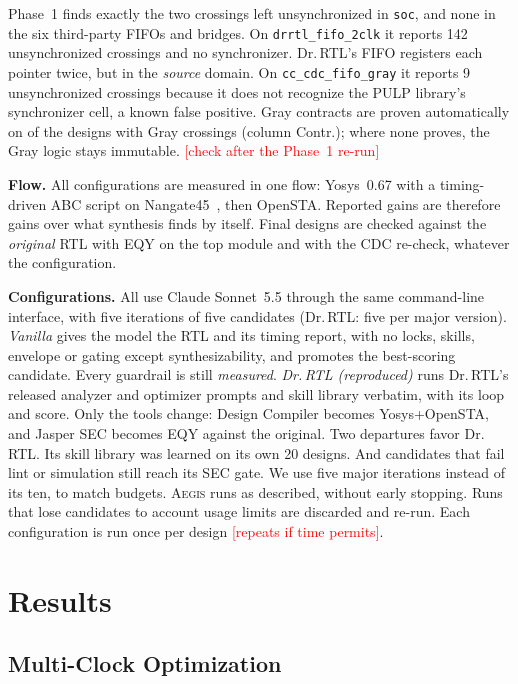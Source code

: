 \documentclass[conference,10pt]{IEEEtran}
\newcommand{\aegis}{\textsc{Aegis}}
\newcommand{\pend}[1]{\textcolor{red}{[#1]}}
\begin{document}
Phase~1 finds exactly the two crossings left unsynchronized in \texttt{soc}, and none in the six third-party
FIFOs and bridges. On \texttt{drrtl\_fifo\_2clk} it reports 142 unsynchronized crossings and
no synchronizer. Dr.\,RTL's FIFO registers each pointer twice, but in the \emph{source} domain. On
\texttt{cc\_cdc\_fifo\_gray} it reports 9 unsynchronized crossings because it does not recognize the PULP
library's synchronizer cell, a known false positive.
Gray contracts are proven automatically on \NMcContractDesigns{} of the \NMcGrayDesigns{} designs with Gray
crossings (column Contr.); where none proves, the Gray logic stays immutable. \pend{check after the Phase~1 re-run}

\textbf{Flow.} All configurations are measured in one flow: Yosys~0.67 with a timing-driven ABC script on
Nangate45~\cite{nangate45}, then OpenSTA. Reported gains are therefore gains over what synthesis finds by itself.
Final designs are checked against the \emph{original} RTL with EQY on the top module and with the CDC re-check,
whatever the configuration.

\textbf{Configurations.} All use Claude Sonnet~5.5 through the same command-line interface, with five iterations of five candidates (Dr.\,RTL: five per major version). \emph{Vanilla} gives the
model the RTL and its timing report, with no locks, skills, envelope or gating except synthesizability, and
promotes the best-scoring candidate. Every guardrail is still \emph{measured}. \emph{Dr.\,RTL (reproduced)} runs
Dr.\,RTL's released analyzer and optimizer prompts and skill library verbatim, with its loop and score. Only the
tools change: Design Compiler becomes Yosys+OpenSTA, and Jasper SEC becomes EQY against the original. Two
departures favor Dr.\,RTL. Its skill library was learned on its own 20 designs. And candidates that fail lint or
simulation still reach its SEC gate. We use five major iterations instead of its ten, to match budgets.
\aegis{} runs as described, without early stopping. Runs that lose candidates to account usage limits are
discarded and re-run. Each
configuration is run once per design \pend{repeats if time permits}.

\section{Results}

\subsection{Multi-Clock Optimization}
\end{document}
